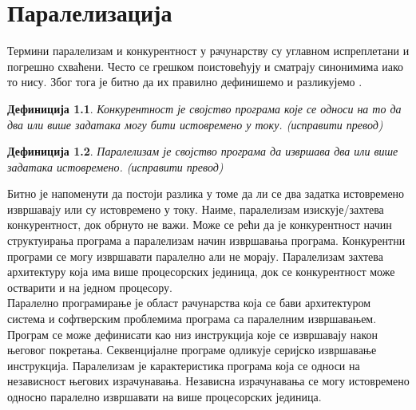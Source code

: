 \documentclass[12pt,oneside]{memoir}
\newtheorem{definic}{Дефиниција}
\begin{document}
\chapter{Паралелизација}
	Термини паралелизам и конкурентност у рачунарству су углавном испреплетани и погрешно схваћени. Често се грешком поистовећују и сматрају синонимима иако то нису. Због тога је битно да их правилно дефинишемо и разликујемо \cite{par_computing}.
\begin{definic}
	Конкурентност је својство програма које се односи на то да два или више задатака могу бити истовремено у току. (исправити превод)
\end{definic}
\begin{definic}
	Паралелизам је својство програма да извршава два или више задатака истовремено. (исправити превод)
\end{definic}

Битно је напоменути да постоји разлика у томе да ли се два задатка истовремено извршавају или су истовремено у току. Наиме, паралелизам изискује/захтева конкурентност, док обрнуто не важи. Може се рећи да је конкурентност начин структуирања програма а паралелизам начин извршавања програма. Конкурентни програми се могу извршавати паралелно али не морају. Паралелизам захтева архитектуру која има више процесорских јединица, док се конкурентност може остварити и на једном процесору.
	\\
 \indent 	Паралелно програмирање је област рачунарства која се бави архитектуром система и софтверским проблемима програма са паралелним извршавањем. Програм се може дефинисати као низ инструкција које се извршавају након његовог покретања. Секвенцијалне програме одликује серијско извршавање инструкција. Паралелизам је карактеристика програма која се односи на независност његових израчунавања. Независна израчунавања се могу истовремено односно паралелно извршавати на више процесорских јединица.
\end{document}
